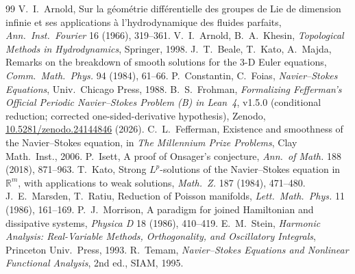 \documentclass[11pt,a4paper]{article}
\theoremstyle{plain}
\theoremstyle{definition}
\theoremstyle{remark}
\begin{document}
\begin{thebibliography}{99}
 V.~I.~Arnold, Sur la g\'eom\'etrie diff\'erentielle des groupes de Lie de dimension infinie et ses applications \`a l'hydrodynamique des fluides parfaits, \emph{Ann.\ Inst.\ Fourier} 16 (1966), 319--361.
 V.~I.~Arnold, B.~A.~Khesin, \emph{Topological Methods in Hydrodynamics}, Springer, 1998.
 J.~T.~Beale, T.~Kato, A.~Majda, Remarks on the breakdown of smooth solutions for the 3-D Euler equations, \emph{Comm.\ Math.\ Phys.} 94 (1984), 61--66.
 P.~Constantin, C.~Foias, \emph{Navier--Stokes Equations}, Univ.\ Chicago Press, 1988.
 B.~S.~Frohman, \emph{Formalizing Fefferman's Official Periodic Navier--Stokes Problem (B) in Lean~4}, v1.5.0 (conditional reduction; corrected one-sided-derivative hypothesis), Zenodo, \href{https://doi.org/10.5281/zenodo.24144846}{10.5281/zenodo.24144846} (2026).
 C.~L.~Fefferman, Existence and smoothness of the Navier--Stokes equation, in \emph{The Millennium Prize Problems}, Clay Math.\ Inst., 2006.
 P.~Isett, A proof of Onsager's conjecture, \emph{Ann.\ of Math.} 188 (2018), 871--963.
 T.~Kato, Strong $L^p$-solutions of the Navier--Stokes equation in $\mathbb R^m$, with applications to weak solutions, \emph{Math.\ Z.} 187 (1984), 471--480.
 J.~E.~Marsden, T.~Ratiu, Reduction of Poisson manifolds, \emph{Lett.\ Math.\ Phys.} 11 (1986), 161--169.
 P.~J.~Morrison, A paradigm for joined Hamiltonian and dissipative systems, \emph{Physica D} 18 (1986), 410--419.
 E.~M.~Stein, \emph{Harmonic Analysis: Real-Variable Methods, Orthogonality, and Oscillatory Integrals}, Princeton Univ.\ Press, 1993.
 R.~Temam, \emph{Navier--Stokes Equations and Nonlinear Functional Analysis}, 2nd ed., SIAM, 1995.
\end{thebibliography}
\end{document}
